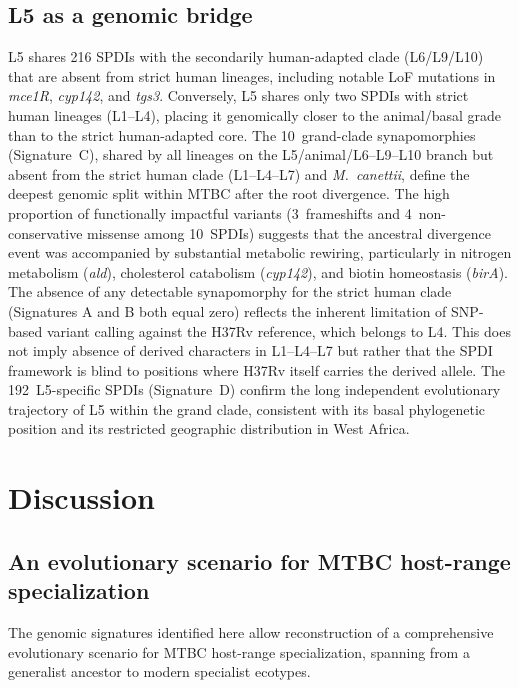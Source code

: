 \documentclass[11pt,a4paper]{article}
\begin{document}
\subsection{L5 as a genomic bridge}
\label{sec:results:l5}

L5 shares 216 SPDIs with the secondarily human-adapted clade (L6/L9/L10) that are absent
from strict human lineages, including notable LoF mutations in \textit{mce1R},
\textit{cyp142}, and \textit{tgs3}.
%
Conversely, L5 shares only two SPDIs with strict human lineages (L1--L4),
placing it genomically closer to the animal/basal grade than to the strict
human-adapted core.
%
The 10~grand-clade synapomorphies (Signature~C), shared by all lineages
on the L5/animal/L6--L9--L10 branch but absent from the strict human
clade (L1--L4--L7) and \textit{M.~canettii}, define the deepest genomic
split within MTBC after the root divergence.
%
The high proportion of functionally impactful variants (3~frameshifts and
4~non-conservative missense among 10~SPDIs) suggests that the ancestral
divergence event was accompanied by substantial metabolic rewiring,
particularly in nitrogen metabolism (\textit{ald}), cholesterol catabolism
(\textit{cyp142}), and biotin homeostasis (\textit{birA}).
%
The absence of any detectable synapomorphy for the strict human clade
(Signatures A and B both equal zero) reflects the inherent limitation of
SNP-based variant calling against the H37Rv reference, which belongs to L4.
This does not imply absence of derived characters in L1--L4--L7 but rather
that the SPDI framework is blind to positions where H37Rv itself carries
the derived allele.
%
The 192~L5-specific SPDIs (Signature~D) confirm the long independent
evolutionary trajectory of L5 within the grand clade, consistent with its
basal phylogenetic position and its restricted geographic distribution in
West Africa.

\section{Discussion}
\label{sec:discussion}

\subsection{An evolutionary scenario for MTBC host-range specialization}
\label{sec:disc:evolution}

The genomic signatures identified here allow reconstruction of a comprehensive
evolutionary scenario for MTBC host-range specialization, spanning from a
generalist ancestor to modern specialist ecotypes.
\end{document}
